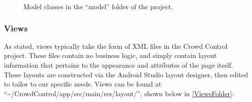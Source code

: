  	\begin{figure}[tbh!]
	\begin{center}
	\end{center}
	\caption{Model classes in the ``model'' folder of the project. \label{ControllersFolder}}
	\end{figure}
 
 \subsubsection{Views}
 As stated, views typically take the form of XML files in the Crowd Control project. These files contain no business logic, and simply contain layout information that pertains to the appearance and attributes of the page itself. These layouts are constructed via the Android Studio layout designer, then edited to tailor to our specific needs. Views can be found at ``\textasciitilde /CrowdControl/app/src/main/res/layout/'', shown below in \ref{ViewsFolder}:
 
